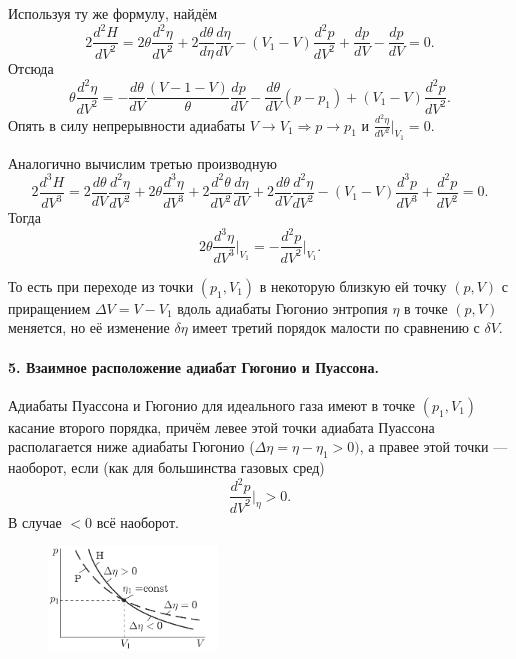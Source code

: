 Используя ту же формулу, найдём  
\[
        2 \frac{d^2 H}{d V^2} = 2\theta \frac{d^2 \eta}{dV^2} + 2
        \frac{d\theta}{d\eta} \frac{d\eta}{dV} - (V_1 - V) \frac{d^2 p}{dV^2} +
        \frac{dp}{dV} - \frac{dp}{dV} = 0.
\]
Отсюда  
\[
        \theta \frac{d^2 \eta}{dV^2} = - \frac{d\theta}{dV} \frac{(V - 1 -
        V)}{\theta} \frac{dp}{dV} - \frac{d\theta}{dV} (p - p_1) + (V_1 - V)
        \frac{d^2 p}{dV^2}.
\]
Опять в силу непрерывности адиабаты $ V \to V_1 \Rightarrow p \to p_1 $ и $
\frac{d^2\eta}{dV^2}\big|_{V_1} = 0 $.

Аналогично вычислим третью производную 
\[
        2\frac{d^3 H}{dV^3} = 2 \frac{d\theta}{dV} \frac{d^2\eta}{dV^2} +
        2\theta \frac{d^3\eta}{dV^3} + 2 \frac{d^2\theta}{dV^2} \frac{d\eta}{dV}
        + 
        2 \frac{d\theta}{dV} \frac{d^2\eta}{dV^2} - (V_1 - V) \frac{d^3 p}{dV^3}
        + \frac{d^2 p}{dV^2} = 0.
\]
Тогда  
\[
    2\theta \frac{d^3\eta}{dV^3}\bigg|_{V_1} = - \frac{d^2 p}{dV^2}
    \bigg|_{V_1}.
\]

То есть при переходе из точки $ (p_1, V_1) $ в некоторую близкую ей точку $ (p,
V)$ с приращением $ \Delta V = V - V_1 $ вдоль адиабаты Гюгонио энтропия $
\eta $ в точке $ (p, V) $ меняется, но её изменение $ \delta \eta $ имеет третий
порядок малости по сравнению с $ \delta V $.

\paragraph{5. Взаимное расположение адиабат Гюгонио и Пуассона.} Адиабаты
Пуассона и Гюгонио для идеального газа имеют в точке $ (p_1, V_1) $ касание
второго порядка, причём левее этой точки адиабата Пуассона располагается ниже
адиабаты Гюгонио ($ \Delta\eta = \eta - \eta_1 > 0) $, а правее этой точки ---
наоборот, если (как для большинства газовых сред)
\[
    \frac{d^2 p}{dV^2}\bigg|_\eta > 0.
\]
В случае $ < 0 $ всё наоборот.
\begin{figure}[H]
    \centering
    \includegraphics[width=0.4\textwidth]{img/puass+gug.png}
    \label{fig:puass-gug}
\end{figure}


